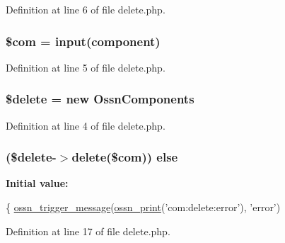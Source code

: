 Definition at line 6 of file delete.\+php.

\subsubsection[{\texorpdfstring{\$com}{$com}}]{\setlength{\rightskip}{0pt plus 5cm}\$com = {\bf input}(\textquotesingle{}component\textquotesingle{})}\hypertarget{actions_2administrator_2component_2delete_8php_aeb238dc1f5c0181fea3117fd9ba0429f}{}\label{actions_2administrator_2component_2delete_8php_aeb238dc1f5c0181fea3117fd9ba0429f}


Definition at line 5 of file delete.\+php.

\subsubsection[{\texorpdfstring{\$delete}{$delete}}]{\setlength{\rightskip}{0pt plus 5cm}\$delete = new {\bf Ossn\+Components}}\hypertarget{actions_2administrator_2component_2delete_8php_aba2374a8b713514611e21494ec2fef8d}{}\label{actions_2administrator_2component_2delete_8php_aba2374a8b713514611e21494ec2fef8d}


Definition at line 4 of file delete.\+php.

\subsubsection[{\texorpdfstring{else}{else}}]{ (\$delete-\/$>$delete(\$com)) else}\hypertarget{actions_2administrator_2component_2delete_8php_a9925185ffaf0178fca2695865d573cbf}{}\label{actions_2administrator_2component_2delete_8php_a9925185ffaf0178fca2695865d573cbf}
{\bfseries Initial value\+:}
\begin{DoxyCode}
\{
        \hyperlink{ossn_8lib_8system_8php_ab3f23f23f32f50c12e7aea0ffaccaac7}{ossn\_trigger\_message}(\hyperlink{ossn_8lib_8languages_8php_a2be5d1c4b695593a9b9067b96df2150a}{ossn\_print}(\textcolor{stringliteral}{'com:delete:error'}), \textcolor{stringliteral}{'error'})
\end{DoxyCode}


Definition at line 17 of file delete.\+php.

